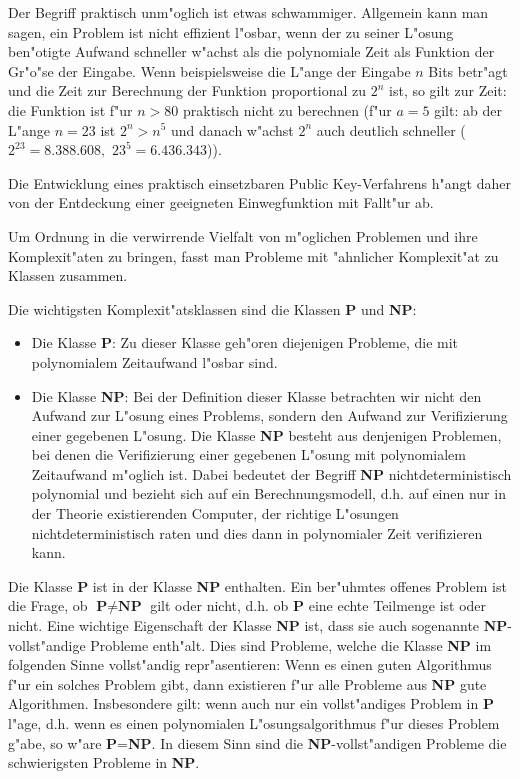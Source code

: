 Der Begriff \glqq praktisch unm"oglich\grqq {} ist etwas schwammiger. Allgemein kann man sagen, ein Problem ist  nicht effizient l"osbar, wenn der zu seiner L"osung ben"otigte Aufwand schneller w"achst als die polynomiale Zeit als Funktion der Gr"o"se der Eingabe. Wenn beispielsweise die L"ange der Eingabe $ n $  Bits betr"agt und die Zeit  zur Berechnung der Funktion proportional zu $ 2^n $ ist, so gilt zur Zeit: die Funktion ist f"ur $n > 80$ praktisch nicht zu berechnen (f"ur $ a=5 $ gilt: ab der L"ange $ n=23 $ ist $ 2^n > n^5 $ und danach w"achst $ 2^n $ auch deutlich schneller ($ 2^{23}=8.388.608, $ $ 23^5= 6.436.343 $)).\par 

Die Entwicklung eines praktisch einsetzbaren Public Key-Verfahrens h"angt daher von der Entdeckung einer geeigneten Einwegfunktion mit Fallt"ur ab.\par

Um Ordnung in die verwirrende Vielfalt von m"oglichen Problemen und ihre Komplexit"aten zu bringen, fasst man Probleme mit "ahnlicher Komplexit"at zu Klassen zusammen.

Die wichtigsten Komplexit"atsklassen  sind die Klassen \textbf{P} und \textbf{NP}: 

\begin{itemize}

    \item Die Klasse \textbf{P}: Zu dieser Klasse geh"oren diejenigen Probleme, die mit polynomialem Zeitaufwand l"osbar sind.
    
    \item Die Klasse \textbf{NP}: Bei der Definition dieser Klasse betrachten wir nicht den Aufwand zur L"osung eines Problems, sondern den Aufwand zur Verifizierung einer gegebenen L"osung. Die Klasse \textbf{NP} besteht aus denjenigen Problemen, bei denen die Verifizierung einer gegebenen L"osung mit polynomialem Zeitaufwand m"oglich ist. Dabei bedeutet der Begriff \textbf{NP} \glqq nichtdeterministisch\grqq {} polynomial und bezieht sich auf ein Berechnungsmodell, d.h. auf einen nur in der Theorie existierenden Computer, der richtige L"osungen nichtdeterministisch \glqq raten\grqq {} und dies dann in polynomialer Zeit verifizieren kann.

\end{itemize}

Die Klasse \textbf{P} ist in der Klasse \textbf{NP} enthalten. Ein ber"uhmtes offenes Problem ist die Frage, ob $ \textbf{P} \neq \textbf{NP} $ gilt oder nicht, d.h. ob \textbf{P} eine echte Teilmenge ist oder nicht. Eine wichtige Eigenschaft der Klasse \textbf{NP} ist, dass sie auch sogenannte \glqq \textbf{NP}-vollst"andige\grqq {} Probleme enth"alt. Dies sind Probleme, welche die Klasse \textbf{NP} im folgenden Sinne vollst"andig repr"asentieren: Wenn es einen \glqq guten\grqq {} Algorithmus f"ur ein solches Problem gibt, dann existieren f"ur alle Probleme aus \textbf{NP} \glqq gute\grqq {} Algorithmen. Insbesondere gilt: wenn auch nur ein vollst"andiges Problem in \textbf{P} l"age, d.h. wenn es einen polynomialen L"osungsalgorithmus f"ur dieses Problem g"abe, so w"are \textbf{P}=\textbf{NP}. In diesem Sinn sind die \textbf{NP}-vollst"andigen Probleme die schwierigsten Probleme in \textbf{NP}.

